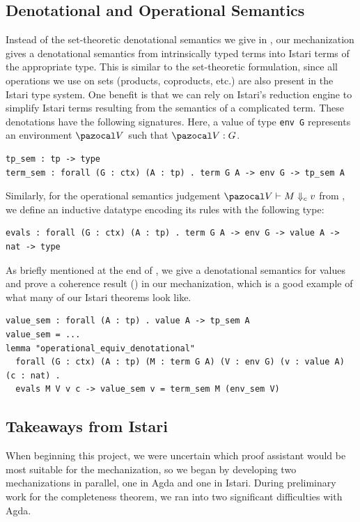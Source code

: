 \subsection{Denotational and Operational Semantics}

Instead of the set-theoretic denotational semantics we give in , our mechanization gives a denotational semantics from intrinsically typed \lfpl terms into Istari terms of the appropriate type. This is similar to the set-theoretic formulation, since all operations we use on sets (products, coproducts, etc.) are also present in the Istari type system. One benefit is that we can rely on Istari's reduction engine to simplify Istari terms resulting from the semantics of a complicated \lfpl term. These denotations have the following signatures.
Here, a value of type \lstinline{env G} represents an environment $\env$ such that $\env : G$. 
\begin{lstlisting}
tp_sem : tp -> type
term_sem : forall (G : ctx) (A : tp) . term G A -> env G -> tp_sem A
\end{lstlisting}
Similarly, for the operational semantics judgement
$\evals{\env}{M}{c}{v}$ from , we
define an inductive datatype encoding its rules with the following
type:
\begin{lstlisting}
evals : forall (G : ctx) (A : tp) . term G A -> env G -> value A -> nat -> type
\end{lstlisting}
As briefly mentioned at the end of , we give a denotational semantics for values and prove a coherence result () in our mechanization, which is a good example of what many of our Istari theorems look like.
\begin{lstlisting}
value_sem : forall (A : tp) . value A -> tp_sem A
value_sem = ...
lemma "operational_equiv_denotational"
  forall (G : ctx) (A : tp) (M : term G A) (V : env G) (v : value A) (c : nat) .
  evals M V v c -> value_sem v = term_sem M (env_sem V)
\end{lstlisting}




\subsection{Takeaways from Istari}

When beginning this project, we were uncertain which proof assistant would be most suitable for the mechanization, so we began by developing two mechanizations in parallel, one in Agda and one in Istari. During preliminary work for the completeness theorem, we ran into two significant difficulties with Agda.

